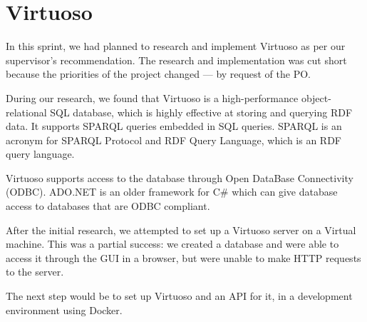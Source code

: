 \section{Virtuoso}
In this sprint, we had planned to research and implement Virtuoso as per our supervisor's recommendation.
The research and implementation was cut short because the priorities of the \knox{} project changed --- by request of the PO.

During our research, we found that Virtuoso is a high-performance object-relational SQL database, which is highly effective at storing and querying RDF data. It supports SPARQL queries embedded in SQL queries. SPARQL is an acronym for SPARQL Protocol and RDF Query Language, which is an RDF query language.


Virtuoso supports access to the database through Open DataBase Connectivity (ODBC).
ADO.NET is an older framework for C\# which can give database access to databases that are ODBC compliant.


After the initial research, we attempted to set up a Virtuoso server on a Virtual machine. This was a partial success: we created a database and were able to access it through the GUI in a browser, but were unable to make HTTP requests to the server.

The next step would be to set up Virtuoso and an API for it, in a development environment using Docker.